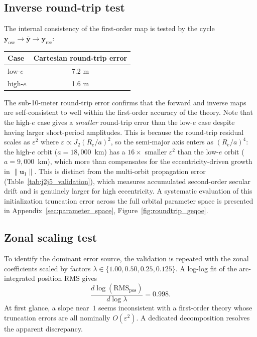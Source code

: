 \documentclass[11pt]{article}
\begin{document}
\subsection{Inverse round-trip test}
\label{sec:roundtrip}

The internal consistency of the first-order map is tested by the cycle
$\bm{y}_{\mathrm{osc}} \to \bar{\bm{y}} \to \bm{y}_{\mathrm{rec}}$:
\begin{center}
\begin{tabular}{lc}
\toprule
Case & Cartesian round-trip error \\
\midrule
low-$e$ & 7.2 m \\
high-$e$ & 1.6 m \\
\bottomrule
\end{tabular}
\end{center}
The sub-10-meter round-trip error confirms that the forward and inverse maps
are self-consistent to well within the first-order accuracy of the theory.
Note that the high-$e$ case gives a \emph{smaller} round-trip error than the
low-$e$ case despite having larger short-period amplitudes. This is because
the round-trip residual scales as $\varepsilon^2$ where
$\varepsilon \propto J_2(R_e/a)^2$, so the semi-major axis enters as
$(R_e/a)^4$: the high-$e$ orbit ($a = 18{,}000$~km) has a $16\times$ smaller
$\varepsilon^2$ than the low-$e$ orbit ($a = 9{,}000$~km), which more than
compensates for the eccentricity-driven growth in $\|\bm{u}_1\|$.
This is distinct from the multi-orbit propagation error
(Table~\ref{tab:j2j5_validation}), which measures accumulated second-order
secular drift and is genuinely larger for high eccentricity.
A systematic evaluation of this initialization truncation error across
the full orbital parameter space is presented in
Appendix~\ref{sec:parameter_space}, Figure~\ref{fig:roundtrip_geqoe}.

\subsection{Zonal scaling test}
\label{sec:scaling_test}

To identify the dominant error source, the validation is repeated with the
zonal coefficients scaled by factors
$\lambda \in \{1.00, 0.50, 0.25, 0.125\}$. A log-log fit of the
arc-integrated position RMS gives
\begin{equation}
\frac{d\log(\mathrm{RMS}_{\mathrm{pos}})}{d\log\lambda} = 0.998.
\label{eq:scaling_slope}
\end{equation}
At first glance, a slope near~$1$ seems inconsistent with a first-order theory
whose truncation errors are all nominally $O(\varepsilon^2)$. A dedicated
decomposition resolves the apparent discrepancy.
\end{document}
